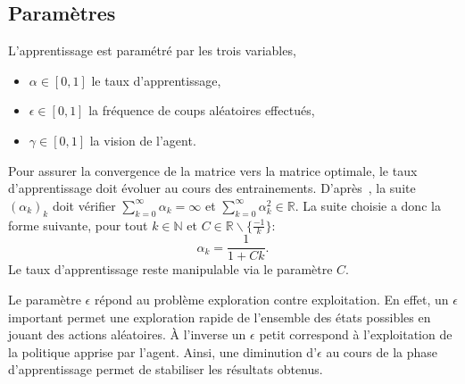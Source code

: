 \documentclass{report}
\newcommand{\R}{\mathbb{R}}
\begin{document}
\subsection{Paramètres}
L'apprentissage est paramétré par les trois variables,
\begin{itemize}
  \item \(\alpha \in [0, 1]\) le taux d'apprentissage,
  \item \(\epsilon \in [0, 1]\) la fréquence de coups aléatoires effectués,
  \item \(\gamma \in [0, 1]\) la vision de l'agent.
\end{itemize}
Pour assurer la convergence de la matrice vers la matrice optimale,
le taux d'apprentissage doit évoluer au cours des entrainements.
D'après~\cite{watkins92}, la suite \( (\alpha_k)_k \) doit vérifier
\( \sum_{k=0}^\infty \alpha_k = \infty \) et \(
\sum_{k=0}^\infty \alpha_k^2 \in \R \). La suite choisie a donc la forme
suivante, pour tout \( k \in \mathbb{N} \) et
\( C \in \R \backslash \{ \frac{-1}{k} \} \):
\[
  \alpha_k = \frac{1}{1 + Ck}.
\]
Le taux d'apprentissage reste manipulable via le paramètre \( C \).



Le paramètre \(\epsilon\) répond au problème exploration contre exploitation. En
effet, un \(\epsilon\) important permet une exploration rapide de l'ensemble
des états possibles en jouant des actions aléatoires. À l'inverse un \(\epsilon\)
petit correspond à l'exploitation de la politique apprise par l'agent. Ainsi,
une diminution d'\(\epsilon\) au cours de la phase d'apprentissage permet de
stabiliser les résultats obtenus.
\end{document}
